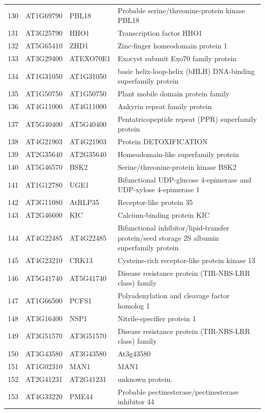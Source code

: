\documentclass[11pt]{article}
\begin{document}
\begin{center}
\begin{tabular}{rlll}
130 & AT1G69790 & PBL18 & Probable serine/threonine-protein kinase PBL18\\
131 & AT3G25790 & HHO1 & Transcription factor HHO1\\
132 & AT5G65410 & ZHD1 & Zinc-finger homeodomain protein 1\\
133 & AT3G29400 & ATEXO70E1 & Exocyst subunit Exo70 family protein\\
134 & AT1G31050 & AT1G31050 & basic helix-loop-helix (bHLH) DNA-binding superfamily protein\\
135 & AT1G50750 & AT1G50750 & Plant mobile domain protein family\\
136 & AT4G11000 & AT4G11000 & Ankyrin repeat family protein\\
137 & AT5G40400 & AT5G40400 & Pentatricopeptide repeat (PPR) superfamily protein\\
138 & AT4G21903 & AT4G21903 & Protein DETOXIFICATION\\
139 & AT2G35640 & AT2G35640 & Homeodomain-like superfamily protein\\
140 & AT5G46570 & BSK2 & Serine/threonine-protein kinase BSK2\\
141 & AT1G12780 & UGE1 & Bifunctional UDP-glucose 4-epimerase and UDP-xylose 4-epimerase 1\\
142 & AT3G11080 & AtRLP35 & Receptor-like protein 35\\
143 & AT2G46600 & KIC & Calcium-binding protein KIC\\
144 & AT4G22485 & AT4G22485 & Bifunctional inhibitor/lipid-transfer protein/seed storage 2S albumin superfamily protein\\
145 & AT4G23210 & CRK13 & Cysteine-rich receptor-like protein kinase 13\\
146 & AT5G41740 & AT5G41740 & Disease resistance protein (TIR-NBS-LRR class) family\\
147 & AT1G66500 & PCFS1 & Polyadenylation and cleavage factor homolog 1\\
148 & AT3G16400 & NSP1 & Nitrile-specifier protein 1\\
149 & AT3G51570 & AT3G51570 & Disease resistance protein (TIR-NBS-LRR class) family\\
150 & AT3G43580 & AT3G43580 & At3g43580\\
151 & AT1G02310 & MAN1 & MAN1\\
152 & AT2G41231 & AT2G41231 & unknown protein.\\
153 & AT4G33220 & PME44 & Probable pectinesterase/pectinesterase inhibitor 44\\

\end{tabular}
\end{center}
\end{document}
